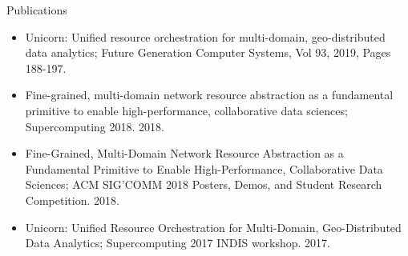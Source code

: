 \documentclass[10pt,oneside]{article}
\newenvironment{ressection}[1]{
	\vspace{4pt}
	{\fontfamily{phv}\selectfont\Large#1}
	\begin{itemize}
	\vspace{3pt}
}{
	\end{itemize}
}
\newcommand{\ressubitem}[1]{
	\vspace{-1pt}
	\item \begin{flushleft} #1 \end{flushleft}
}
\begin{document}
\begin{ressection}{Publications}
	\ressubitem{Unicorn: Unified resource orchestration for multi-domain, geo-distributed data analytics; Future Generation Computer Systems, Vol 93, 2019, Pages 188-197.}
	\ressubitem{Fine-grained, multi-domain network resource abstraction as a
    fundamental primitive to enable high-performance, collaborative data
    sciences; Supercomputing 2018. 2018. }
	\ressubitem{Fine-Grained, Multi-Domain Network Resource Abstraction as a Fundamental Primitive to Enable High-Performance, Collaborative Data Sciences; ACM SIG’COMM 2018 Posters, Demos, and Student Research Competition. 2018.}
	\ressubitem{Unicorn: Unified Resource Orchestration for Multi-Domain, Geo-Distributed Data Analytics; Supercomputing 2017 INDIS workshop. 2017.}
\end{ressection}
	
\end{document}
